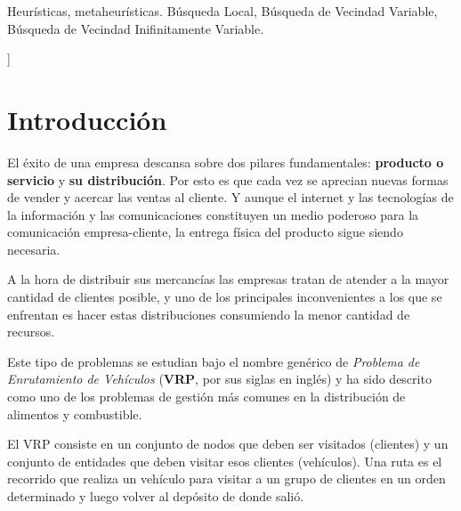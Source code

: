 \documentclass[a4paper,10pt,twocolumn]{article}
\begin{document}
\begin{topics}
	Heurísticas, metaheurísticas. Búsqueda Local, Búsqueda de Vecindad Variable, 
	Búsqueda de Vecindad Inifinitamente Variable.
\end{topics}


\vspace{0.8cm}
]



\section{Introducción}\label{sec:intro}
  	El éxito de una empresa descansa sobre dos pilares fundamentales: \textbf{producto 
  	o servicio} y \textbf{su distribución}. Por esto es que cada vez se aprecian nuevas
  	formas de vender y acercar las ventas al cliente. Y aunque el internet y las 
  	tecnologías de la información y las comunicaciones constituyen un medio poderoso 
  	para la comunicación empresa-cliente, la entrega física del producto sigue siendo 
  	necesaria.
  	
  	A la hora de distribuir sus mercancías las empresas tratan de atender a 
  	la mayor cantidad de clientes posible, y uno de los principales inconvenientes a 
  	los que se enfrentan es hacer estas distribuciones consumiendo la menor cantidad 
  	de recursos.

	Este tipo de problemas se estudian bajo el nombre genérico de \textit{Problema de 
	Enrutamiento de Vehículos} (\textbf{VRP}, por sus siglas en inglés) y ha sido 
	descrito como uno de los problemas de gestión más comunes en la distribución de 
	alimentos y combustible.

	El VRP consiste en un conjunto de nodos que deben ser visitados (clientes) y un 
	conjunto de entidades que deben visitar esos clientes (vehículos). Una ruta es el 
	recorrido que realiza un vehículo para visitar a un grupo de clientes en un orden 
	determinado y luego volver al depósito de donde	salió.
\end{document}

